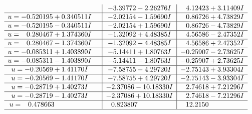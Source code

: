 \documentclass[1p]{elsarticle_modified}
\theoremstyle{definition}
\begin{document}
$$\begin{array}{c|c|c}
 & -3.39772 - 2.26276 I & \phantom{-}4.12423 + 3.11409 I \\ \hline\begin{aligned}
u &= -0.520195 + 0.340511 I\end{aligned}
 & -2.02154 - 1.59690 I & \phantom{-}0.86726 + 4.73829 I \\ \hline\begin{aligned}
u &= -0.520195 - 0.340511 I\end{aligned}
 & -2.02154 + 1.59690 I & \phantom{-}0.86726 - 4.73829 I \\ \hline\begin{aligned}
u &= \phantom{-}0.280467 + 1.374360 I\end{aligned}
 & -1.32092 + 4.48385 I & \phantom{-}4.56586 - 2.47352 I \\ \hline\begin{aligned}
u &= \phantom{-}0.280467 - 1.374360 I\end{aligned}
 & -1.32092 - 4.48385 I & \phantom{-}4.56586 + 2.47352 I \\ \hline\begin{aligned}
u &= -0.085311 + 1.403890 I\end{aligned}
 & -5.14411 + 1.80763 I & -0.25907 - 2.73625 I \\ \hline\begin{aligned}
u &= -0.085311 - 1.403890 I\end{aligned}
 & -5.14411 - 1.80763 I & -0.25907 + 2.73625 I \\ \hline\begin{aligned}
u &= -0.20569 + 1.41170 I\end{aligned}
 & -7.58755 - 4.29720 I & -2.75143 + 3.93304 I \\ \hline\begin{aligned}
u &= -0.20569 - 1.41170 I\end{aligned}
 & -7.58755 + 4.29720 I & -2.75143 - 3.93304 I \\ \hline\begin{aligned}
u &= -0.28719 + 1.40273 I\end{aligned}
 & -2.37086 - 10.18330 I & \phantom{-}2.74618 + 7.21296 I \\ \hline\begin{aligned}
u &= -0.28719 - 1.40273 I\end{aligned}
 & -2.37086 + 10.18330 I & \phantom{-}2.74618 - 7.21296 I \\ \hline\begin{aligned}
u &= \phantom{-}0.478663\phantom{ +0.000000I}\end{aligned}
 & \phantom{-}0.823807\phantom{ +0.000000I} & \phantom{-}12.2150\phantom{ +0.000000I}\\
 \hline 
 \end{array}$$\newpage
\end{document}
